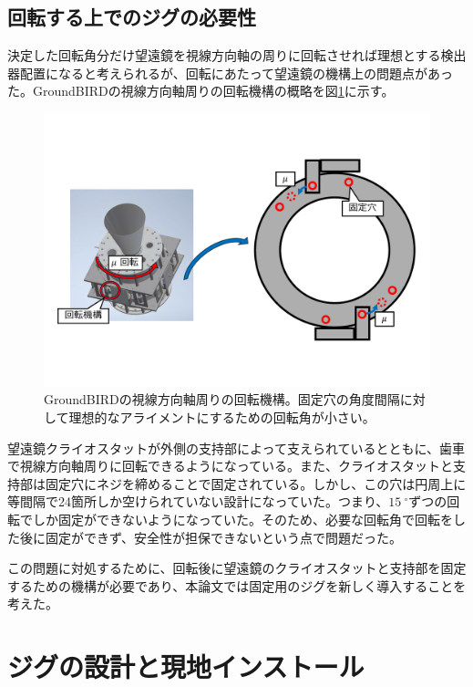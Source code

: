 \subsection{回転する上でのジグの必要性}
決定した回転角分だけ望遠鏡を視線方向軸の周りに回転させれば理想とする検出器配置になると考えられるが、回転にあたって望遠鏡の機構上の問題点があった。GroundBIRDの視線方向軸周りの回転機構の概略を図\ref{gb_fixing_system}に示す。
\begin{figure}[htbp]
  \centering
  \includegraphics[width=0.85\columnwidth]{5_alignment/figs/gb_fixing_system.pdf}
  \caption{GroundBIRDの視線方向軸周りの回転機構。固定穴の角度間隔に対して理想的なアライメントにするための回転角が小さい。}
  \label{gb_fixing_system}
\end{figure}
望遠鏡クライオスタットが外側の支持部によって支えられているとともに、歯車で視線方向軸周りに回転できるようになっている。また、クライオスタットと支持部は固定穴にネジを締めることで固定されている。しかし、この穴は円周上に等間隔で24箇所しか空けられていない設計になっていた。つまり、$\SI{15}{^{\circ}}$ずつの回転でしか固定ができないようになっていた。そのため、必要な回転角で回転をした後に固定ができず、安全性が担保できないという点で問題だった。

この問題に対処するために、回転後に望遠鏡のクライオスタットと支持部を固定するための機構が必要であり、本論文では固定用のジグを新しく導入することを考えた。
\section{ジグの設計と現地インストール}

